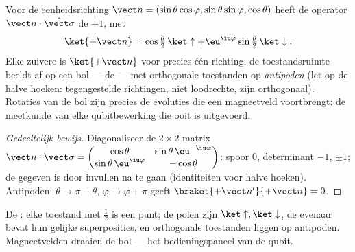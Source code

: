 \begin{proposition}\label{prop:b3:spin-two-level:bloch}
Voor de eenheidsrichting $\vect n = (\sin\theta\cos\varphi,
\sin\theta\sin\varphi, \cos\theta)$ heeft de operator $\vect
n\cdot\hat{\vect\sigma}$ de  $\pm1$, met
\[
\ket{+\vect n} = \cos\tfrac\theta2\,\ket\uparrow +
\eu^{\iu\varphi}\sin\tfrac\theta2\,\ket\downarrow .
\]
Elke zuivere  is $\ket{+\vect n}$ voor precies één richting: de
toestandsruimte beeldt af op een bol --- de \emph{} --- met
orthogonale toestanden op \emph{antipoden} (let op de halve hoeken:
tegengestelde richtingen, niet loodrechte, zijn orthogonaal). Rotaties van
de bol zijn precies de evoluties die een magneetveld voortbrengt: de
meetkunde van elke qubitbewerking die ooit is uitgevoerd.
\end{proposition}

\begin{proof}[Gedeeltelijk bewijs]
Diagonaliseer de $2\times2$-matrix $\vect n\cdot\vect\sigma =
\begin{pmatrix}\cos\theta & \sin\theta\,\eu^{-\iu\varphi}\\
\sin\theta\,\eu^{\iu\varphi} & -\cos\theta\end{pmatrix}$: spoor $0$,
determinant $-1$,  $\pm1$; de gegeven  is door invullen
na te gaan (identiteiten voor halve hoeken). Antipoden: $\theta \to \pi -
\theta$, $\varphi \to \varphi + \pi$ geeft $\braket{+\vect
n'}{+\vect n} = 0$.
\end{proof}

\begin{omfigure}

{\small De : elke toestand met  $\tfrac12$ is een punt; de
polen zijn $\ket\uparrow, \ket\downarrow$, de evenaar bevat hun
gelijke superposities, en orthogonale toestanden liggen op antipoden.
Magneetvelden draaien de bol --- het bedieningspaneel van de qubit.}
\end{omfigure}

